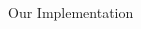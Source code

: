 \documentclass[final,t]{beamer}
\makeatletter
\DeclareRobustCommand\onedot{\futurelet\@let@token\@onedot}
\def\@onedot{\ifx\@let@token.\else.\null\fi\xspace}
\def\eg{{e.g}\onedot} \def\Eg{{E.g}\onedot}
\makeatother
\begin{document}
\begin{frame}{}
\begin{columns}[t]
\begin{column}{.305\linewidth}
\begin{block}{Our Implementation}
      \end{block}





\end{column}
\end{columns}
\end{frame}
\end{document}
